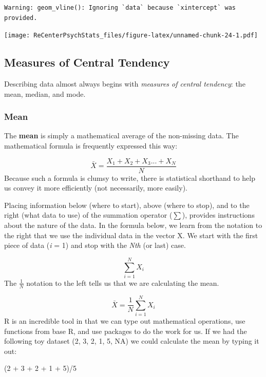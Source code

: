 \documentclass[
  11pt,
]{book}
\newenvironment{Shaded}{\begin{snugshade}}{\end{snugshade}}
\newcommand{\DecValTok}[1]{\textcolor[rgb]{0.00,0.00,0.81}{#1}}
\newcommand{\NormalTok}[1]{#1}
\newcommand{\SpecialCharTok}[1]{\textcolor[rgb]{0.00,0.00,0.00}{#1}}
\begin{document}
\begin{verbatim}
Warning: geom_vline(): Ignoring `data` because `xintercept` was provided.
\end{verbatim}

\texttt{[image: ReCenterPsychStats\_files/figure-latex/unnamed-chunk-24-1.pdf]}

\hypertarget{measures-of-central-tendency}{%
\subsection{Measures of Central Tendency}\label{measures-of-central-tendency}}

Describing data almost always begins with \emph{measures of central tendency}: the mean, median, and mode.

\hypertarget{mean}{%
\subsubsection{Mean}\label{mean}}

The \textbf{mean} is simply a mathematical average of the non-missing data. The mathematical formula is frequently expressed this way:

\[\bar{X} = \frac{X_{1} + X_{2} + X_{3}...+ X_{N}}{N}\]
Because such a formula is clumsy to write, there is statistical shorthand to help us convey it more efficiently (not necessarily, more easily).

Placing information below (where to start), above (where to stop), and to the right (what data to use) of the summation operator (\(\sum\)), provides instructions about the nature of the data. In the formula below, we learn from the notation to the right that we use the individual data in the vector X. We start with the first piece of data (\emph{i} = 1) and stop with the \emph{Nth} (or last) case.

\[\sum_{i=1}^{N}X_{i}\]
The \(\frac{1}{N}\) notation to the left tells us that we are calculating the mean.

\[\bar{X}=\frac{1}{N}\sum_{i=1}^{N}X_{i}\]
R is an incredible tool in that we can type out mathematical operations, use functions from base R, and use packages to do the work for us. If we had the following toy dataset (2, 3, 2, 1, 5, NA) we could calculate the mean by typing it out:

\begin{Shaded}
\begin{Highlighting}[]
\NormalTok{(}\DecValTok{2} \SpecialCharTok{+} \DecValTok{3} \SpecialCharTok{+} \DecValTok{2} \SpecialCharTok{+} \DecValTok{1} \SpecialCharTok{+} \DecValTok{5}\NormalTok{)}\SpecialCharTok{/}\DecValTok{5}
\end{Highlighting}
\end{Shaded}
\end{document}
